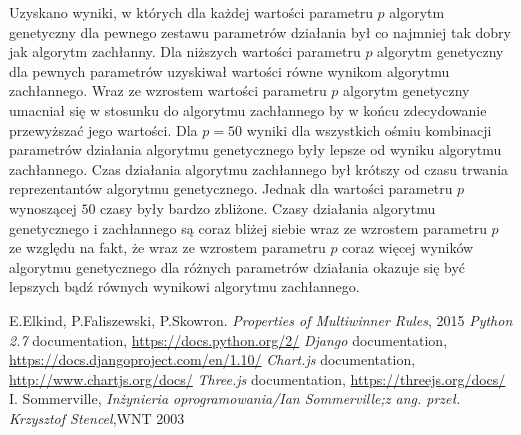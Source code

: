 \documentclass[polish,11pt]{aghthesis}
\begin{document}
\noindent Uzyskano wyniki, w których dla każdej wartości parametru $p$ algorytm genetyczny dla pewnego zestawu parametrów działania był co najmniej tak dobry jak algorytm zachłanny. Dla niższych wartości parametru $p$ algorytm genetyczny dla pewnych parametrów uzyskiwał wartości równe wynikom algorytmu zachłannego. Wraz ze wzrostem wartości parametru $p$ algorytm genetyczny umacniał się w stosunku do algorytmu zachłannego by w końcu zdecydowanie przewyższać jego wartości. Dla $p=50$ wyniki dla wszystkich ośmiu kombinacji parametrów działania algorytmu genetycznego były lepsze od wyniku algorytmu zachłannego. Czas działania algorytmu zachłannego był krótszy od czasu trwania reprezentantów algorytmu genetycznego. Jednak dla wartości parametru $p$ wynoszącej $50$ czasy były bardzo zbliżone. Czasy działania algorytmu genetycznego i zachłannego są coraz bliżej siebie wraz ze wzrostem parametru $p$ ze względu na fakt, że wraz ze wzrostem parametru $p$ coraz więcej wyników algorytmu genetycznego dla różnych parametrów działania okazuje się być lepszych bądź równych wynikowi algorytmu zachłannego.    

\clearpage
{}
\listoffigures




%
\begin{thebibliography}{99}
\bibitem{}
E.Elkind, P.Faliszewski, P.Skowron. \textit{Properties of Multiwinner Rules}, 2015
\bibitem{}
\textit{Python 2.7} documentation, \url{https://docs.python.org/2/} 
\bibitem{}
\textit{Django} documentation, \url{https://docs.djangoproject.com/en/1.10/}
\bibitem{}
\textit{Chart.js} documentation, \url{http://www.chartjs.org/docs/}
\bibitem{}
\textit{Three.js} documentation, \url{https://threejs.org/docs/}
\bibitem{}
I. Sommerville, \textit{Inżynieria oprogramowania/Ian Sommerville;z ang. przeł. Krzysztof Stencel},WNT 2003

\end{thebibliography}
\end{document}
